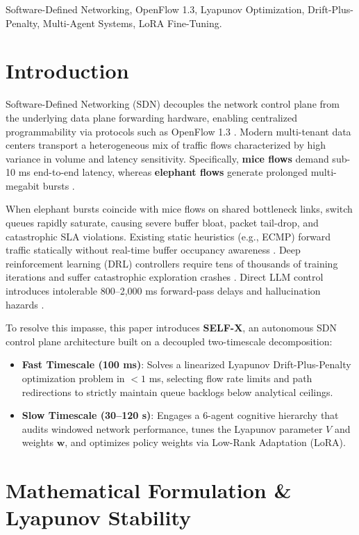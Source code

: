 \documentclass[conference]{IEEEtran}
\begin{document}
\begin{IEEEkeywords}
Software-Defined Networking, OpenFlow 1.3, Lyapunov Optimization, Drift-Plus-Penalty, Multi-Agent Systems, LoRA Fine-Tuning.
\end{IEEEkeywords}

\section{Introduction}
Software-Defined Networking (SDN) decouples the network control plane from the underlying data plane forwarding hardware, enabling centralized programmability via protocols such as OpenFlow 1.3 \cite{mckeown2008openflow}. Modern multi-tenant data centers transport a heterogeneous mix of traffic flows characterized by high variance in volume and latency sensitivity. Specifically, \textbf{mice flows} demand sub-10 ms end-to-end latency, whereas \textbf{elephant flows} generate prolonged multi-megabit bursts \cite{alizadeh2010dctcp}.

When elephant bursts coincide with mice flows on shared bottleneck links, switch queues rapidly saturate, causing severe buffer bloat, packet tail-drop, and catastrophic SLA violations. Existing static heuristics (e.g., ECMP) forward traffic statically without real-time buffer occupancy awareness \cite{hopps2000ecmp}. Deep reinforcement learning (DRL) controllers require tens of thousands of training iterations and suffer catastrophic exploration crashes \cite{xu2018experience}. Direct LLM control introduces intolerable 800--2,000 ms forward-pass delays and hallucination hazards \cite{zhang2024hotnets}.

To resolve this impasse, this paper introduces \textbf{SELF-X}, an autonomous SDN control plane architecture built on a decoupled two-timescale decomposition:
\begin{itemize}
    \item \textbf{Fast Timescale (100 ms)}: Solves a linearized Lyapunov Drift-Plus-Penalty optimization problem in $<1$ ms, selecting flow rate limits and path redirections to strictly maintain queue backlogs below analytical ceilings.
    \item \textbf{Slow Timescale (30--120 s)}: Engages a 6-agent cognitive hierarchy that audits windowed network performance, tunes the Lyapunov parameter $V$ and weights $\mathbf{w}$, and optimizes policy weights via Low-Rank Adaptation (LoRA).
\end{itemize}

\section{Mathematical Formulation \& Lyapunov Stability}
\end{document}
